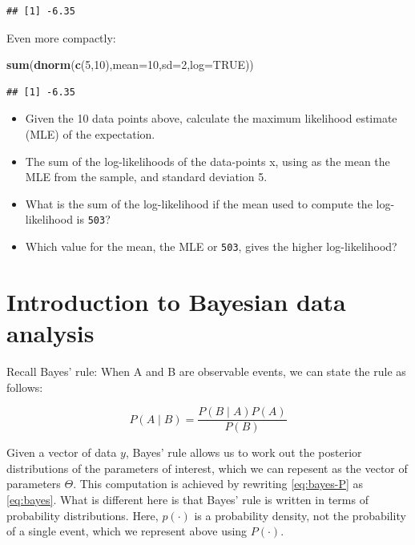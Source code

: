 \documentclass[12pt,]{krantz}
\newenvironment{Shaded}{\begin{snugshade}}{\end{snugshade}}
\newcommand{\KeywordTok}[1]{\textcolor[rgb]{0.13,0.29,0.53}{\textbf{#1}}}
\newcommand{\DataTypeTok}[1]{\textcolor[rgb]{0.13,0.29,0.53}{#1}}
\newcommand{\DecValTok}[1]{\textcolor[rgb]{0.00,0.00,0.81}{#1}}
\newcommand{\OtherTok}[1]{\textcolor[rgb]{0.56,0.35,0.01}{#1}}
\newcommand{\NormalTok}[1]{#1}
\providecommand{\tightlist}{%
  \setlength{\itemsep}{0pt}\setlength{\parskip}{0pt}}
\theoremstyle{definition}
\theoremstyle{definition}
\theoremstyle{definition}
\theoremstyle{remark}
\begin{document}
\begin{verbatim}
## [1] -6.35
\end{verbatim}

Even more compactly:

\begin{Shaded}
\begin{Highlighting}[]
\KeywordTok{sum}\NormalTok{(}\KeywordTok{dnorm}\NormalTok{(}\KeywordTok{c}\NormalTok{(}\DecValTok{5}\NormalTok{,}\DecValTok{10}\NormalTok{),}\DataTypeTok{mean=}\DecValTok{10}\NormalTok{,}\DataTypeTok{sd=}\DecValTok{2}\NormalTok{,}\DataTypeTok{log=}\OtherTok{TRUE}\NormalTok{))}
\end{Highlighting}
\end{Shaded}

\begin{verbatim}
## [1] -6.35
\end{verbatim}

\begin{itemize}
\tightlist
\item
  Given the 10 data points above, calculate the maximum likelihood
  estimate (MLE) of the expectation.
\item
  The sum of the log-likelihoods of the data-points x, using as the mean
  the MLE from the sample, and standard deviation 5.
\item
  What is the sum of the log-likelihood if the mean used to compute the
  log-likelihood is \texttt{503}?
\item
  Which value for the mean, the MLE or \texttt{503}, gives the higher
  log-likelihood?
\end{itemize}

\chapter{Introduction to Bayesian data analysis}\label{introBDA}

Recall Bayes' rule: When A and B are observable events, we can state the
rule as follows:

\begin{equation}
P(A\mid B) = \frac{P(B\mid A) P(A)}{P(B)}
\label{eq:bayes-P}
\end{equation}

Given a vector of data \(y\), Bayes' rule allows us to work out the
posterior distributions of the parameters of interest, which we can
repesent as the vector of parameters \(\Theta\). This computation is
achieved by rewriting \eqref{eq:bayes-P} as \eqref{eq:bayes}. What is
different here is that Bayes' rule is written in terms of probability
distributions. Here, \(p(\cdot)\) is a probability density, not the
probability of a single event, which we represent above using
\(P(\cdot)\).
\end{document}
